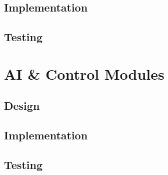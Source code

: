 \subsection{Implementation}\label{soft/cv/impl}

\subsection{Testing}\label{soft/cv/test}



\section{AI \& Control Modules}\label{soft/ai}

\subsection{Design}\label{soft/ai/design}

\subsection{Implementation}\label{soft/ai/impl}

\subsection{Testing}\label{soft/ai/test}